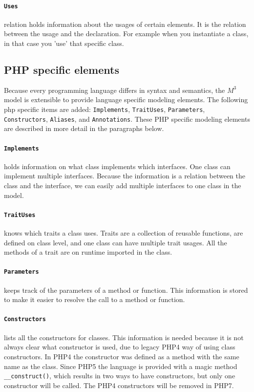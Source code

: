 \documentclass[../main.tex]{subfiles}
\begin{document}
    \paragraph{\texttt{Uses}} relation holds information about the usages of certain elements.
    It is the relation between the usage and the declaration.
    For example when you instantiate a class, in that case you 'use' that specific class.
    
    \subsection{PHP specific elements}
    Because every programming language differs in syntax and semantics, the $M^3$ model is extensible to provide language specific modeling elements.
    The following php specific items are added: \texttt{Implements}, \texttt{TraitUses}, \texttt{Parameters}, \texttt{Constructors}, \texttt{Aliases}, and \texttt{Annotations}.
    These PHP specific modeling elements are described in more detail in the paragraphs below.
    
    \paragraph{\texttt{Implements}} holds information on what class implements which interfaces.
    One class can implement multiple interfaces.
    Because the information is a relation between the class and the interface, we can easily add multiple interfaces to one class in the model.
    
    \paragraph{\texttt{TraitUses}} knows which traits a class uses.
    Traits are a collection of reusable functions, are defined on class level, and one class can have multiple trait usages.
    All the methods of a trait are on runtime imported in the class.
    
    \paragraph{\texttt{Parameters}} keeps track of the parameters of a method or function.
    This information is stored to make it easier to resolve the call to a method or function.
    
    \paragraph{\texttt{Constructors}} lists all the constructors for classes. 
    This information is needed because it is not always clear what constructor is used, due to legacy PHP4 way of using class constructors.
    In PHP4 the constructor was defined as a method with the same name as the class.
    Since PHP5 the language is provided with a magic method \texttt{\_\_construct()}, which results in two ways to have constructors, but only one constructor will be called.
    The PHP4 constructors will be removed in PHP7.
    
\end{document}
